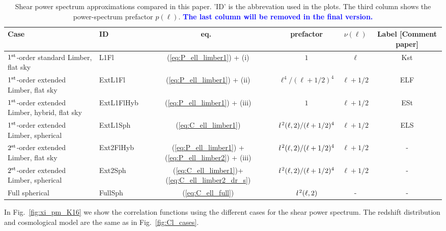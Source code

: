\documentclass[useAMS,usenatbib]{mn2e} %
\newcommand{\ellbar}{\hbox{\it \l}\,}
\newcommand{\mk}[1]{{\bf\textcolor{blue}{#1}}}
\begin{document}
\renewcommand{\baselinestretch}{1.3}
\begin{table}

  \label{tab:cases}

  \caption{Shear power spectrum approximations compared in this paper. 'ID' is the abbrevation used in the plots.
    The third column shows the power-spectrum prefactor $p(\ell)$.  \mk{The last column will be removed in the
        final version.}}

  \begin{tabular}{|l|l|c|c|c|c}
  \hline
  Case & ID & eq.~ & prefactor & $\nu(\ell)$ & Label [Comment paper] \\ \hline
  $1^{\rm st}$-order standard Limber, flat sky & L1Fl & (\ref{eq:P_ell_limber1}) + (i)
    & $1$ & $\ell$ & Kst \\ \hline
  $1^{\rm st}$-order extended Limber, flat sky & ExtL1Fl & (\ref{eq:P_ell_limber1}) + (ii)
    & $\ell^4/(\ell+1/2)^4$ & $\ell + 1/2$ & ELF \\ \hline
  $1^{\rm st}$-order extended Limber, hybrid, flat sky & ExtL1FlHyb & (\ref{eq:P_ell_limber1}) + (iii)
    & $1$ & $\ell + 1/2$ & ESt \\ \hline
  $1^{\rm st}$-order extended Limber, spherical & ExtL1Sph & (\ref{eq:C_ell_limber1})
    & $\ellbar^2(\ell, 2)/(\ell+1/2)^4$ & $\ell+1/2$ & ELS \\ \hline
  $2^{\rm st}$-order extended Limber, flat sky & Ext2FlHyb &  (\ref{eq:P_ell_limber1}) + (\ref{eq:P_ell_limber2}) + (iii)
    & $\ellbar^2(\ell, 2)/(\ell+1/2)^4$ & $\ell+1/2$ & - \\ \hline
  $2^{\rm st}$-order extended Limber, spherical & Ext2Sph & (\ref{eq:C_ell_limber1})+(\ref{eq:C_ell_limber2_dr_s})
    & $\ellbar^2(\ell, 2)/(\ell+1/2)^4$ & $\ell+1/2$ & - \\ \hline
  Full spherical & FullSph & (\ref{eq:C_ell_full}) &
      $\ellbar^2(\ell, 2)$ & - & - \\ \hline
  \end{tabular}

\end{table}
\renewcommand{\baselinestretch}{1}

In Fig.~\ref{fig:xi_pm_K16} we show the correlation functions using the different cases
for the shear power spectrum. The redshift distribution and cosmological model are the same 
as in Fig.~\ref{fig:Cl_cases}.
\end{document}
